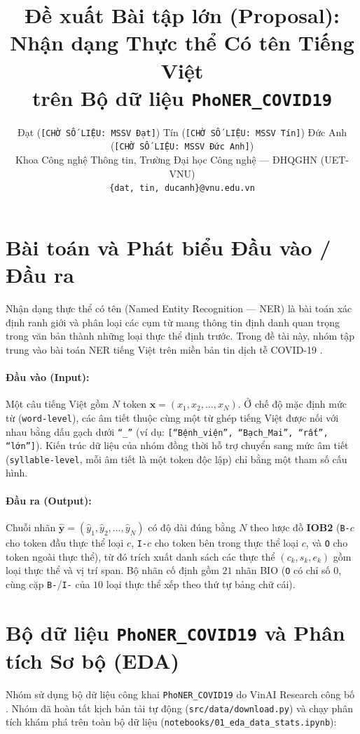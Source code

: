 \documentclass[11pt,a4paper,twocolumn]{article}
\title{Đề xuất Bài tập lớn (Proposal): Nhận dạng Thực thể Có tên Tiếng Việt\\
trên Bộ dữ liệu \texttt{PhoNER\_COVID19}}
\author{
  Đạt (\texttt{[CHỜ SỐ LIỆU: MSSV Đạt]}) \quad
  Tín (\texttt{[CHỜ SỐ LIỆU: MSSV Tín]}) \quad
  Đức Anh (\texttt{[CHỜ SỐ LIỆU: MSSV Đức Anh]}) \\
  Khoa Công nghệ Thông tin, Trường Đại học Công nghệ — ĐHQGHN (UET-VNU) \\
  \texttt{\{dat, tin, ducanh\}@vnu.edu.vn}
}
\date{}
\begin{document}
\maketitle

\section{Bài toán và Phát biểu Đầu vào / Đầu ra}
Nhận dạng thực thể có tên (Named Entity Recognition — NER) là bài toán xác định ranh giới và phân loại các cụm từ mang thông tin định danh quan trọng trong văn bản thành những loại thực thể định trước. Trong đề tài này, nhóm tập trung vào bài toán NER tiếng Việt trên miền bản tin dịch tễ COVID-19 \citep{truong-etal-2021-covid}.

\paragraph{Đầu vào (Input):}
Một câu tiếng Việt gồm $N$ token $\mathbf{x} = (x_1, x_2, \dots, x_N)$. Ở chế độ mặc định mức từ (\texttt{word-level}), các âm tiết thuộc cùng một từ ghép tiếng Việt được nối với nhau bằng dấu gạch dưới \texttt{``\_''} (ví dụ: \texttt{[``Bệnh\_viện'', ``Bạch\_Mai'', ``rất'', ``lớn'']}). Kiến trúc dữ liệu của nhóm đồng thời hỗ trợ chuyển sang mức âm tiết (\texttt{syllable-level}, mỗi âm tiết là một token độc lập) chỉ bằng một tham số cấu hình.

\paragraph{Đầu ra (Output):}
Chuỗi nhãn $\hat{\mathbf{y}} = (\hat{y}_1, \hat{y}_2, \dots, \hat{y}_N)$ có độ dài đúng bằng $N$ theo lược đồ \textbf{IOB2} (\texttt{B-}$c$ cho token đầu thực thể loại $c$, \texttt{I-}$c$ cho token bên trong thực thể loại $c$, và \texttt{O} cho token ngoài thực thể), từ đó trích xuất danh sách các thực thể $(c_k, s_k, e_k)$ gồm loại thực thể và vị trí span. Bộ nhãn cố định gồm $21$ nhãn BIO (\texttt{O} có chỉ số $0$, cùng cặp \texttt{B-}/\texttt{I-} của $10$ loại thực thể xếp theo thứ tự bảng chữ cái).

\section{Bộ dữ liệu \texttt{PhoNER\_COVID19} và Phân tích Sơ bộ (EDA)}
Nhóm sử dụng bộ dữ liệu công khai \texttt{PhoNER\_COVID19} do VinAI Research công bố \citep{truong-etal-2021-covid}. Nhóm đã hoàn tất kịch bản tải tự động (\texttt{src/data/download.py}) và chạy phân tích khám phá trên toàn bộ dữ liệu (\texttt{notebooks/01\_eda\_data\_stats.ipynb}):
\end{document}
